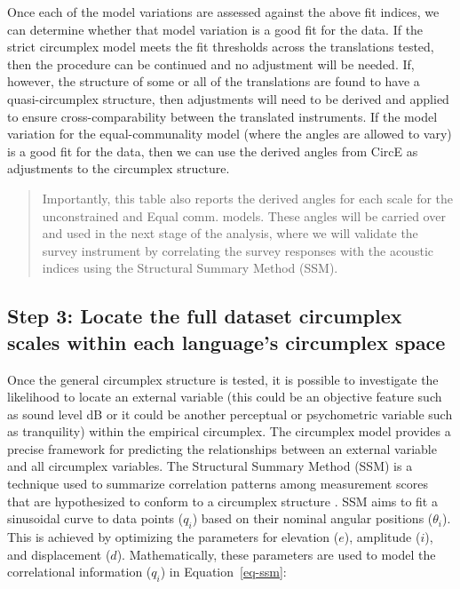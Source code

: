 \documentclass[
  authoryear,
  preprint,
  3p]{elsarticle}
\begin{document}
Once each of the model variations are assessed against the above fit
indices, we can determine whether that model variation is a good fit for
the data. If the strict circumplex model meets the fit thresholds across
the translations tested, then the procedure can be continued and no
adjustment will be needed. If, however, the structure of some or all of
the translations are found to have a quasi-circumplex structure, then
adjustments will need to be derived and applied to ensure
cross-comparability between the translated instruments. If the model
variation for the equal-communality model (where the angles are allowed
to vary) is a good fit for the data, then we can use the derived angles
from CircE as adjustments to the circumplex structure.

\begin{quote}
Importantly, this table also reports the derived angles for each scale
for the unconstrained and Equal comm. models. These angles will be
carried over and used in the next stage of the analysis, where we will
validate the survey instrument by correlating the survey responses with
the acoustic indices using the Structural Summary Method (SSM).
\end{quote}

\subsection{Step 3: Locate the full dataset circumplex scales within
each language's circumplex
space}\label{step-3-locate-the-full-dataset-circumplex-scales-within-each-languages-circumplex-space}

Once the general circumplex structure is tested, it is possible to
investigate the likelihood to locate an external variable (this could be
an objective feature such as sound level dB or it could be another
perceptual or psychometric variable such as tranquility) within the
empirical circumplex. The circumplex model provides a precise framework
for predicting the relationships between an external variable and all
circumplex variables. The Structural Summary Method (SSM) is a technique
used to summarize correlation patterns among measurement scores that are
hypothesized to conform to a circumplex structure
\citep{Rogoza2021three}. SSM aims to fit a sinusoidal curve to data
points (\(q_i\)) based on their nominal angular positions
(\(\theta_i\)). This is achieved by optimizing the parameters for
elevation (\(e\)), amplitude (\(i\)), and displacement (\(d\)).
Mathematically, these parameters are used to model the correlational
information (\(q_i\)) in Equation~\ref{eq-ssm}:
\end{document}
